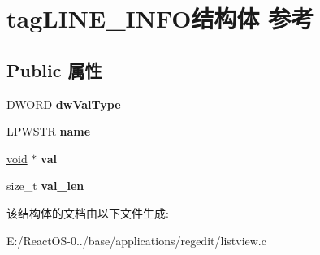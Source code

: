 \hypertarget{structtag_l_i_n_e___i_n_f_o}{}\section{tag\+L\+I\+N\+E\+\_\+\+I\+N\+F\+O结构体 参考}
\label{structtag_l_i_n_e___i_n_f_o}
\subsection*{Public 属性}
\begin{DoxyCompactItemize}
\item 
\mbox{\label{structtag_l_i_n_e___i_n_f_o_a752c43ae242de0fe9c9d2119bbd69cc7}} 
D\+W\+O\+RD {\bfseries dw\+Val\+Type}
\item 
\mbox{\label{structtag_l_i_n_e___i_n_f_o_adcb949416a51d97628e35294ef982031}} 
L\+P\+W\+S\+TR {\bfseries name}
\item 
\mbox{\label{structtag_l_i_n_e___i_n_f_o_ac24162978db6e3f31539d2f2a7f94e81}} 
\hyperlink{interfacevoid}{void} $\ast$ {\bfseries val}
\item 
\mbox{\label{structtag_l_i_n_e___i_n_f_o_ae6977ebd628400bb4fc7a8105f9fa449}} 
size\+\_\+t {\bfseries val\+\_\+len}
\end{DoxyCompactItemize}


该结构体的文档由以下文件生成\+:\begin{DoxyCompactItemize}
\item 
E\+:/\+React\+O\+S-\/0../base/applications/regedit/listview.\+c\end{DoxyCompactItemize}
